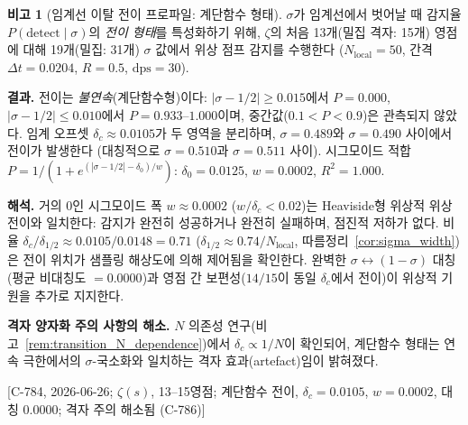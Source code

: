 \documentclass[11pt, a4paper]{article}
\theoremstyle{definition}
\newtheorem{remark}{비고}[section]
\theoremstyle{plain}
\begin{document}
\begin{remark}[임계선 이탈 전이 프로파일: 계단함수 형태]
\label{rem:transition_profile}
$\sigma$가 임계선에서 벗어날 때 감지율
$P(\mathrm{detect}\mid\sigma)$의 \emph{전이 형태}를
특성화하기 위해, $\zeta$의 처음 13개(밀집 격자: 15개) 영점에 대해
19개(밀집: 31개) $\sigma$ 값에서 위상 점프 감지를 수행한다
($N_{\mathrm{local}}{=}50$, 간격 $\Delta t = 0.0204$,
$R = 0.5$, $\mathrm{dps}{=}30$).

\smallskip\noindent
\textbf{결과.}\;
전이는 \emph{불연속}(계단함수형)이다:
$|\sigma - 1/2| \ge 0.015$에서 $P = 0.000$,
$|\sigma - 1/2| \le 0.010$에서 $P = 0.933$--$1.000$이며,
중간값($0.1 < P < 0.9$)은 관측되지 않았다.
임계 오프셋 $\delta_c \approx 0.0105$가 두 영역을 분리하며,
$\sigma = 0.489$와 $\sigma = 0.490$ 사이에서 전이가 발생한다
(대칭적으로 $\sigma = 0.510$과 $\sigma = 0.511$ 사이).
시그모이드 적합 $P = 1/(1 + e^{(|\sigma - 1/2| - \delta_0)/w})$:
$\delta_0 = 0.0125$, $w = 0.0002$, $R^2 = 1.000$.

\smallskip\noindent
\textbf{해석.}\;
거의 0인 시그모이드 폭 $w \approx 0.0002$
($w/\delta_c < 0.02$)는
Heaviside형 위상적 위상 전이와 일치한다:
감지가 완전히 성공하거나 완전히 실패하며, 점진적 저하가 없다.
비율 $\delta_c / \delta_{1/2} \approx 0.0105/0.0148 = 0.71$
($\delta_{1/2} \approx 0.74/N_{\mathrm{local}}$,
따름정리~\ref{cor:sigma_width})은
전이 위치가 샘플링 해상도에 의해 제어됨을 확인한다.
완벽한 $\sigma\leftrightarrow(1{-}\sigma)$ 대칭
(평균 비대칭도 $= 0.0000$)과
영점 간 보편성($14/15$이 동일 $\delta_c$에서 전이)이
위상적 기원을 추가로 지지한다.

\smallskip\noindent
\textbf{격자 양자화 주의 사항의 해소.}\;
$N$ 의존성 연구(비고~\ref{rem:transition_N_dependence})에서
$\delta_c \propto 1/N$이 확인되어, 계단함수 형태는
연속 극한에서의 $\sigma$-국소화와 일치하는
격자 효과(artefact)임이 밝혀졌다.

[C-784, 2026-06-26; $\zeta(s)$, 13--15영점;
계단함수 전이, $\delta_c{=}0.0105$,
$w{=}0.0002$, 대칭 $0.0000$;
격자 주의 해소됨 (C-786)]
\end{remark}
\end{document}
